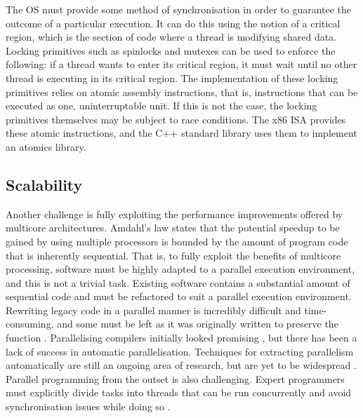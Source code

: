 \documentclass[bsc,frontabs,twoside,singlespacing,parskip,deptreport]{infthesis}     %
\begin{document}
The OS must provide some method of synchronisation in order to guarantee the outcome of a particular execution. It can do this using the notion of a critical region, which is the section of code where a thread is modifying shared data. Locking primitives such as spinlocks and mutexes can be used to enforce the following: if a thread wants to enter its critical region, it must wait until no other thread is executing in its critical region. The implementation of these locking primitives relies on atomic assembly instructions, that is, instructions that can be executed as one, uninterruptable unit. If this is not the case, the locking primitives themselves may be subject to race conditions. The x86 ISA provides these atomic instructions, and the C++ standard library uses them to implement an atomics library.

\subsection{Scalability} \label{scalability-challenges}
Another challenge is fully exploiting the performance improvements offered by multicore architectures. Amdahl’s law \cite{DBLP:conf/afips/Amdahl67} \cite{DBLP:journals/computer/Amdahl13} states that the potential speedup to be gained by using multiple processors is bounded by the amount of program code that is inherently sequential. That is, to fully exploit the benefits of multicore processing, software must be highly adapted to a parallel execution environment, and this is not a trivial task. Existing software contains a substantial amount of sequential code and must be refactored to suit a parallel execution environment. Rewriting legacy code in a parallel manner is incredibly difficult and time-consuming, and some must be left as it was originally written to preserve the function \cite{geer}. Parallelising compilers initially looked promising \cite{lamport}, but there has been a lack of success in automatic parallelisation. Techniques for extracting parallelism automatically are still an ongoing area of research, but are yet to be widespread \cite{franke}. Parallel programming from the outset is also challenging. Expert programmers must explicitly divide tasks into threads that can be run concurrently and avoid synchronisation issues while doing so \cite{geer}. 
\end{document}

